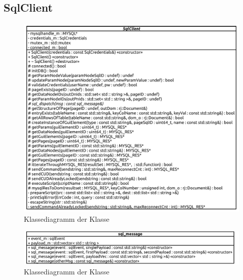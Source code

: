 \subsection{SqlClient}
\begin{figure}[ht]
  \centering
  \includegraphics[width=\textwidth]{content/hauptteil/umsetzungPoC/backend/uml/classesOfOverview/SqlClient.pdf}
  \caption{Klassediagramm der Klasse }
  \label{fig:backend:classDiag:SqlClient}
\end{figure}
\begin{figure}[ht]
  \centering
  \includegraphics[width=\textwidth]{content/hauptteil/umsetzungPoC/backend/uml/classesOfOverview/sql_message.pdf}
  \caption{Klassediagramm der Klasse }
  \label{fig:backend:classDiag:sqlMsg}
\end{figure}
